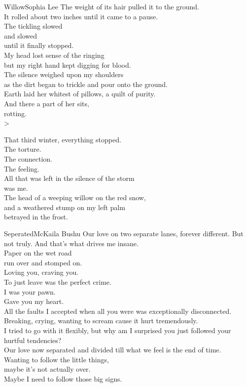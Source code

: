 \begin{poetry}{Willow}{Sophia Lee}
    The weight of its hair pulled it to the ground.\\
    It rolled about two inches until it came to a pause.\\
    The tickling slowed\\
    and slowed\\
    until it finally stopped.\\
    My head lost sense of the ringing\\
    but my right hand kept digging for blood.\\
    The silence weighed upon my shoulders\\
    as the dirt began to trickle and pour onto the ground.\\
    Earth laid her whitest of pillows, a quilt of purity.\\
    And there a part of her sits,\\
    rotting.\\>
    
    That third winter, everything stopped.\\
    The torture.\\
    The connection.\\
    The feeling.\\
    All that was left in the silence of the storm\\
    was me.\\
    The head of a weeping willow on the red snow,\\
    and a weathered stump on my left palm\\
    betrayed in the frost.
\end{poetry}
    
    



\begin{poetry}{Seperated}{McKaila Bushu}
Our love on two separate lanes, forever different. But not truly. And that's what drives me insane.\\
Paper on the wet road\\
run over and stomped on.\\
Loving you, craving you.\\
To just leave was the perfect crime.\\
I was your pawn.\\
Gave you my heart.\\
All the faults I accepted when all you were was exceptionally disconnected.\\
Breaking, crying, wanting to scream cause it hurt tremendously.\\
I tried to go with it flexibly, but why am I surprised you just followed your hurtful tendencies?\\
Our love now separated and divided till what we feel is the end of time.\\
Wanting to follow the little things,\\
maybe it's not actually over.\\
Maybe I need to follow those big signs.
\end{poetry}

